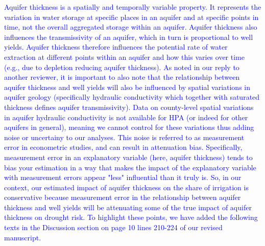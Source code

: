 \documentclass[
]{article}
\begin{document}
\textcolor{blue}{Aquifer thickness is a spatially and temporally variable property. It  represents the variation in water storage at specific places in an aquifer and at specific points in time, not the overall aggregated storage within an aquifer. Aquifer thickness also influences the transmissivity of an aquifer, which in turn is proportional to well yields. Aquifer thickness therefore influences the potential rate of water extraction at different points within an aquifer and how this varies over time (e.g., due to depletion reducing aquifer thickness). As noted in our reply to another reviewer, it is important to also note that the relationship between aquifer thickness and well yields will also be influenced by spatial variations in aquifer geology (specifically hydraulic conductivity which together with saturated thickness defines aquifer transmissivity). Data on county-level spatial variations in aquifer hydraulic conductivity is not available for HPA (or indeed for other aquifers in general), meaning we cannot control for these variations thus adding noise or uncertainy to our analyses. This noise is referred to as measurement error in econometric studies, and can result in attenuation bias. Specifically, measurement error in an explanatory variable (here, aquifer thickness) tends to bias your estimation in a way that makes the impact of the explanatory variable with measurement errors appear "less" influential than it truly is. So, in our context, our estimated impact of aquifer thickness on the share of irrigation is conservative because measurement error in the relationship between aquifer thickness and well yields will be attenuating some of the true impact of aquifer thickness on drought risk. To highlight these points, we have added the following texts in the Discussion section on page 10 lines 210-224 of our revised manuscript.}
\end{document}
